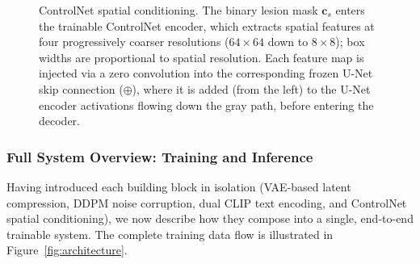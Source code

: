 \begin{figure}[H]
{%
  }
  \caption{ControlNet spatial conditioning. The binary lesion mask $\mathbf{c}_s$ enters the trainable ControlNet encoder, which extracts spatial features at four progressively coarser resolutions ($64\times64$ down to $8\times8$); box widths are proportional to spatial resolution. Each feature map is injected via a zero convolution into the corresponding frozen U-Net skip connection ($\oplus$), where it is added (from the left) to the U-Net encoder activations flowing down the gray path, before entering the decoder.}
  \label{fig:controlnet}
\end{figure}

\subsubsection{Full System Overview: Training and Inference}\label{sec:overview}

Having introduced each building block in isolation (VAE-based latent compression, DDPM noise corruption, dual CLIP text encoding, and ControlNet spatial conditioning), we now describe how they compose into a single, end-to-end trainable system. The complete training data flow is illustrated in Figure~\ref{fig:architecture}.

